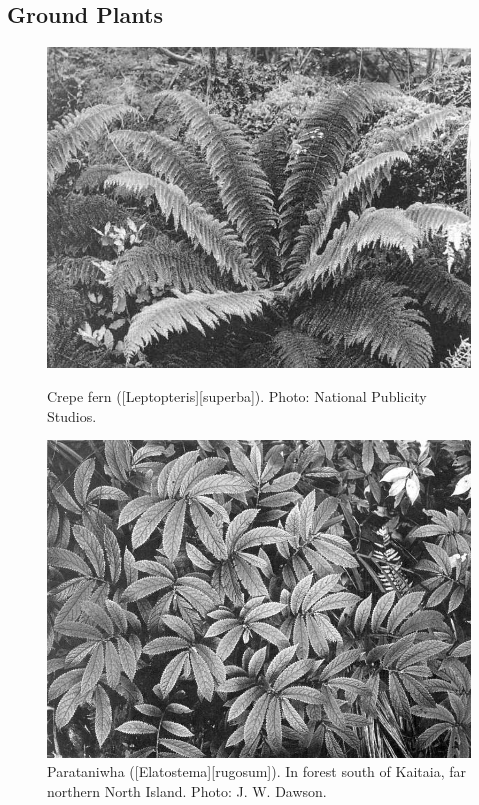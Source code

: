 \subsection{Ground Plants}

\begin{figure}[htb]
	\centering
	\begin{minipage}[t]{0.487\textwidth}
		\centering
		\includegraphics[width=\textwidth]{graphics/figure62crepefern.jpg}
    	\caption[Crepe fern (\emph{Leptopteris superba})]{Crepe fern ([Leptopteris][superba]).
    	Photo: National Publicity Studios.}%
    	\label{fig:62crepefern}
	\end{minipage}\hfill%
	\begin{minipage}[t]{0.493\textwidth}
    	\centering
    	\includegraphics[width=\textwidth]{graphics/figure63parataniwha.jpg}
    	\caption[Parataniwha]{Parataniwha ([Elatostema][rugosum]).
        In forest south of Kaitaia, far northern North Island.
    	Photo: J. W. Dawson.}%
    	\label{fig:63parataniwha}
	\end{minipage}
\end{figure}

